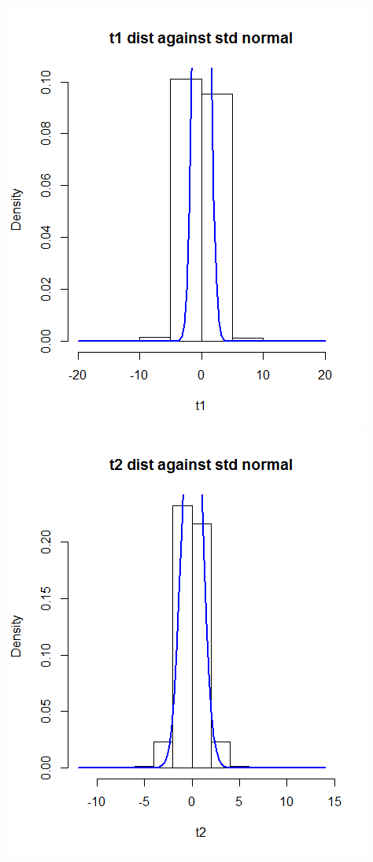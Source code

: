 \documentclass{article}
\begin{document}
\begin{enumerate}
\begin{enumerate}
\begin{center}
					 \includegraphics[scale=.5]{t1_10}
						 \includegraphics[scale=.5]{t2_10}

\end{center}
\end{enumerate}
\end{enumerate}
\end{document}

